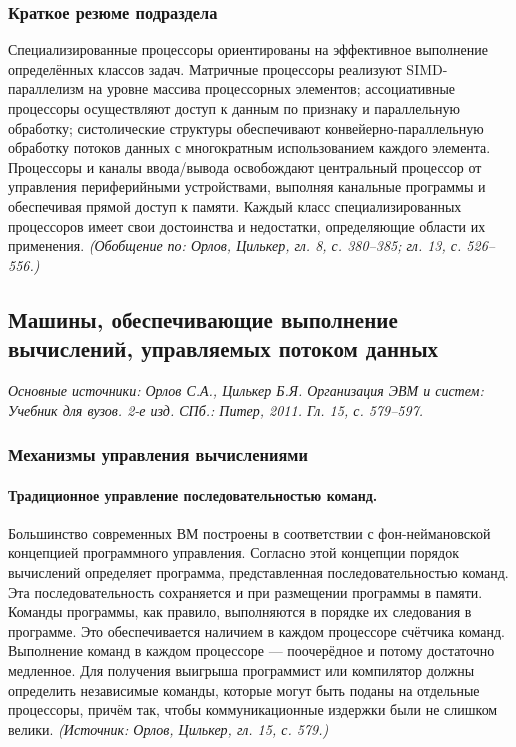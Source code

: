 \documentclass[a4paper,12pt]{article}
\begin{document}
\subsubsection{Краткое резюме подраздела}
Специализированные процессоры ориентированы на эффективное выполнение определённых классов задач. Матричные процессоры реализуют SIMD-параллелизм на уровне массива процессорных элементов; ассоциативные процессоры осуществляют доступ к данным по признаку и параллельную обработку; систолические структуры обеспечивают конвейерно-параллельную обработку потоков данных с многократным использованием каждого элемента. Процессоры и каналы ввода/вывода освобождают центральный процессор от управления периферийными устройствами, выполняя канальные программы и обеспечивая прямой доступ к памяти. Каждый класс специализированных процессоров имеет свои достоинства и недостатки, определяющие области их применения.
\textit{(Обобщение по: Орлов, Цилькер, гл. 8, с. 380--385; гл. 13, с. 526--556.)}

\subsection{Машины, обеспечивающие выполнение вычислений, управляемых потоком данных}

\noindent\textit{Основные источники: Орлов С.А., Цилькер Б.Я. Организация ЭВМ и систем: Учебник для вузов. 2-е изд. СПб.: Питер, 2011. Гл. 15, с. 579--597.}

\subsubsection{Механизмы управления вычислениями}

\paragraph{Традиционное управление последовательностью команд.}
Большинство современных ВМ построены в соответствии с фон-неймановской концепцией программного управления. Согласно этой концепции порядок вычислений определяет программа, представленная последовательностью команд. Эта последовательность сохраняется и при размещении программы в памяти. Команды программы, как правило, выполняются в порядке их следования в программе. Это обеспечивается наличием в каждом процессоре счётчика команд. Выполнение команд в каждом процессоре — поочерёдное и потому достаточно медленное. Для получения выигрыша программист или компилятор должны определить независимые команды, которые могут быть поданы на отдельные процессоры, причём так, чтобы коммуникационные издержки были не слишком велики.
\textit{(Источник: Орлов, Цилькер, гл. 15, с. 579.)}
\end{document}
